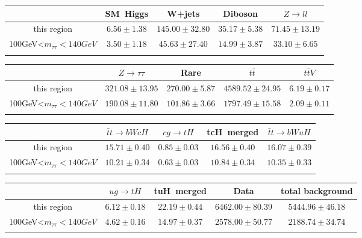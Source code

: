 \centering
\begin{tabular}{ccccc} \toprule\toprule
 & SM~Higgs & W+jets & Diboson & $Z\to ll$\\\midrule
this region & $6.56\pm1.38$ & $145.00\pm32.80$ & $35.17\pm5.38$ & $71.45\pm13.19$\\
100GeV<$m_{\tau\tau}<140GeV$ & $3.50\pm1.18$ & $45.63\pm27.40$ & $14.99\pm3.87$ & $33.10\pm6.65$\\
\bottomrule\bottomrule\\
\end{tabular}
\begin{tabular}{ccccc} \toprule\toprule
 & $Z\to \tau\tau$ & Rare & $t\bar{t}$ & $t\bar{t}V$\\\midrule
this region & $321.08\pm13.95$ & $270.00\pm5.87$ & $4589.52\pm24.95$ & $6.19\pm0.17$\\
100GeV<$m_{\tau\tau}<140GeV$ & $190.08\pm11.80$ & $101.86\pm3.66$ & $1797.49\pm15.58$ & $2.09\pm0.11$\\
\bottomrule\bottomrule\\
\end{tabular}
\begin{tabular}{ccccc} \toprule\toprule
 & $\bar{t}t\to bWcH$ & $cg\to tH$ & tcH~merged & $\bar{t}t\to bWuH$\\\midrule
this region & $15.71\pm0.40$ & $0.85\pm0.03$ & $16.56\pm0.40$ & $16.07\pm0.39$\\
100GeV<$m_{\tau\tau}<140GeV$ & $10.21\pm0.34$ & $0.63\pm0.03$ & $10.84\pm0.34$ & $10.35\pm0.33$\\
\bottomrule\bottomrule\\
\end{tabular}
\begin{tabular}{ccccc} \toprule\toprule
 & $ug\to tH$ & tuH~merged & Data & total background\\\midrule
this region & $6.12\pm0.18$ & $22.19\pm0.44$ & $6462.00\pm80.39$ & $5444.96\pm46.18$\\
100GeV<$m_{\tau\tau}<140GeV$ & $4.62\pm0.16$ & $14.97\pm0.37$ & $2578.00\pm50.77$ & $2188.74\pm34.74$\\
\bottomrule\bottomrule\\
\end{tabular}
